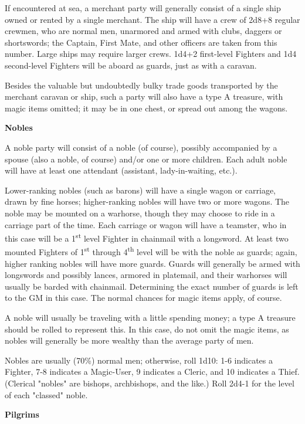 \documentclass[a4paper,twoside,openany,10pt]{book}
\begin{document}
\begin{multicols}{2}
If encountered at sea, a merchant party will generally consist of a single ship owned or rented by a single merchant. The ship will have a crew of 2d8+8 regular crewmen, who are normal men, unarmored and armed with clubs, daggers or shortswords; the Captain, First Mate, and other officers are taken from this number. Large ships may require larger crews. 1d4+2 first-level Fighters and 1d4 second-level Fighters will be aboard as guards, just as with a caravan.

Besides the valuable but undoubtedly bulky trade goods transported by the merchant caravan or ship, such a party will also have a type A treasure, with magic items omitted; it may be in one chest, or spread out among the wagons.

\textbf{Nobles}

A noble party will consist of a noble (of course), possibly accompanied by a spouse (also a noble, of course) and/or one or more children. Each adult noble will have at least one attendant (assistant, lady-in-waiting, etc.).

Lower-ranking nobles (such as barons) will have a single wagon or carriage, drawn by fine horses; higher-ranking nobles will have two or more wagons. The noble may be mounted on a warhorse, though they may choose to ride in a carriage part of the time. Each carriage or wagon will have a teamster, who in this case will be a 1\textsuperscript{st} level Fighter in chainmail with a longsword. At least two mounted Fighters of 1\textsuperscript{st} through 4\textsuperscript{th} level will be with the noble as guards; again, higher ranking nobles will have more guards. Guards will generally be armed with longswords and possibly lances, armored in platemail, and their warhorses will usually be barded with chainmail. Determining the exact number of guards is left to the GM in this case. The normal chances for magic items apply, of course.

A noble will usually be traveling with a little spending money; a type A treasure should be rolled to represent this. In this case, do not omit the magic items, as nobles will generally be more wealthy than the average party of men.

Nobles are usually (70\%) normal men; otherwise, roll 1d10: 1-6 indicates a Fighter, 7-8 indicates a Magic-User, 9 indicates a Cleric, and 10 indicates a Thief. (Clerical "nobles" are bishops, archbishops, and the like.) Roll 2d4-1 for the level of each "classed" noble. 

\textbf{Pilgrims}


\end{multicols}
\end{document}
